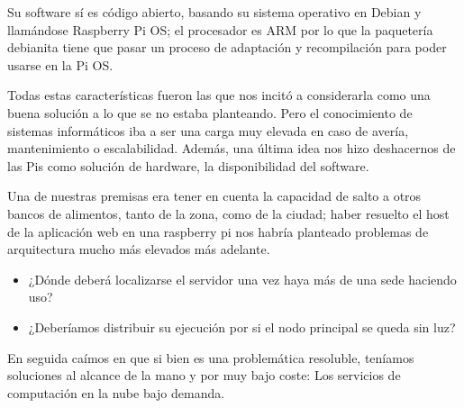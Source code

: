 \par Su software sí es código abierto, basando su sistema operativo en Debian y llamándose Raspberry Pi OS; el procesador es ARM por lo que la paquetería debianita tiene que pasar un proceso de adaptación y recompilación para poder usarse en la Pi OS.
\vspace{1em}
\par Todas estas características fueron las que nos incitó a considerarla como una buena solución a lo que se no estaba planteando. Pero el conocimiento de sistemas informáticos iba a ser una carga muy elevada en caso de avería, mantenimiento o escalabilidad. Además, una última idea nos hizo deshacernos de las Pis como solución de hardware, la disponibilidad del software.
\vspace{1em}
\par Una de nuestras premisas era tener en cuenta la capacidad de salto a otros bancos de alimentos, tanto de la zona, como de la ciudad; haber resuelto el host de la aplicación web en una raspberry pi nos habría planteado problemas de arquitectura mucho más elevados más adelante.
\begin{itemize}
    \item ¿Dónde deberá localizarse el servidor una vez haya más de una sede haciendo uso?
    \item ¿Deberíamos distribuir su ejecución por si el nodo principal se queda sin luz?
\end{itemize}
En seguida caímos en que si bien es una problemática resoluble, teníamos soluciones al alcance de la mano y por muy bajo coste: Los servicios de computación en la nube bajo demanda.
\clearpage
